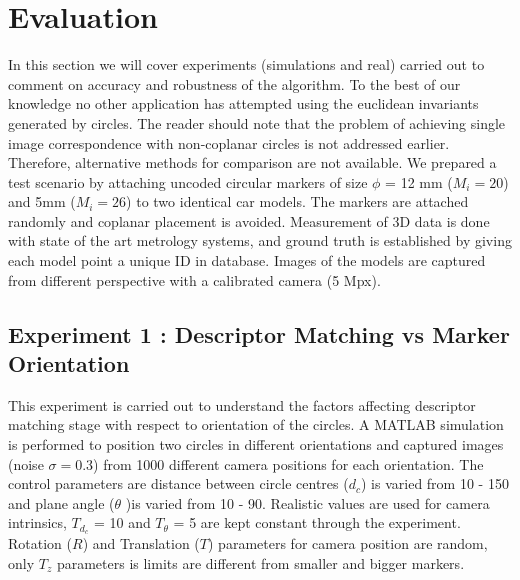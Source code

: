 \documentclass{bmvc2k}
\begin{document}
\section{Evaluation}
In this section we will cover experiments (simulations and real) carried out to comment on accuracy and robustness of the algorithm. To the best of our knowledge no other application has attempted using the euclidean invariants generated by circles. 
The reader should note that the problem of achieving single image correspondence with non-coplanar circles is not addressed earlier. Therefore, alternative methods for comparison are not available. 
We prepared a test scenario by attaching uncoded circular markers of size $ \phi $ = 12 mm ($ M_i = 20 $) and 5mm ($ M_i  = 26$) to two identical car models.  
The markers are attached randomly and coplanar placement is avoided.
Measurement of 3D data is done with state of the art metrology systems, and ground truth is established by giving each model point a unique ID in database. 
Images of the models are captured from different perspective with a calibrated camera (5 Mpx). 

\subsection{Experiment 1 : Descriptor Matching vs Marker Orientation}
This experiment is carried out to understand the factors affecting descriptor matching stage with respect to orientation of the circles.
A MATLAB simulation is performed to position two circles in different orientations and captured images (noise $ \sigma = 0.3 $) from 1000 different camera positions for each orientation.  
The control parameters are distance between circle centres ($ d_c $) is varied from 10 - 150 and plane angle ($ \theta $ )is varied from 10 - 90. Realistic values are used for camera intrinsics, $ T_{d_c} $ = 10 and $ T_\theta $ = 5 are kept constant through the experiment. Rotation ($ R $) and Translation ($ T $) parameters for camera position are random, only $ T_z $ parameters is limits are different from smaller and bigger markers. 
\end{document}
